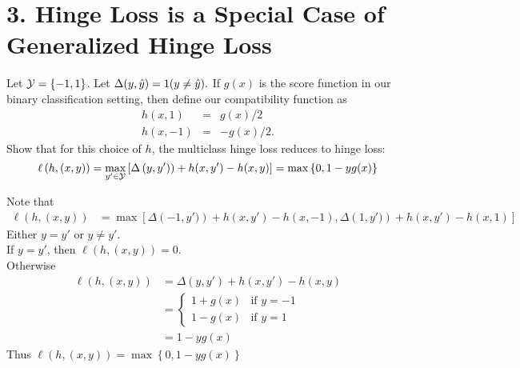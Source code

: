 \documentclass[12pt,letterpaper]{article}
\begin{document}
\section*{3. Hinge Loss is a Special Case of Generalized Hinge Loss}
\begin{problem}{3}
    Let $\mathcal{Y}=\left\{ -1,1\right\} $. Let $\Delta(y,\hat{y})=1(y\neq\hat{y}).$
    If $g(x)$ is the score function in our binary classification setting,
    then define our compatibility function as 
    \begin{eqnarray*}
    h(x,1) & = & g(x)/2\\
    h(x,-1) & = & -g(x)/2.
    \end{eqnarray*}
    Show that for this choice of $h$, the multiclass hinge loss reduces
    to hinge loss: 
    \[
    \ell\left(h,\left(x,y\right)\right)=\max_{y'\in\mathcal{Y}}\left[\Delta\left(y,y')\right)+h(x,y')-h(x,y)\right]=\max\left\{ 0,1-yg(x)\right\} 
    \]
\end{problem}
\begin{solution}{}
    Note that
    \begin{align*}
        \ell\left(h,\left(x,y\right)\right) &= \max\left[\Delta\left(-1,y')\right)+h(x,y')-h(x,-1), \Delta\left(1,y')\right)+h(x,y')-h(x,1)\right]
    \end{align*}
    Either $y=y'$ or $y\neq y'$.\\
    If $y=y'$, then $\ell(h,(x,y)) = 0$.\\
    Otherwise
    \begin{align*}
        \ell(h,(x,y)) &= \Delta(y,y') + h(x,y') - h(x,y)\\
        &= \left\{
            	\begin{array}{ll}
            		1 + g(x)  & \mbox{if } y = -1 \\
            		1 - g(x) & \mbox{if } y = 1
            	\end{array}
            \right.\\
        &= 1-yg(x)
    \end{align*}
    Thus $\ell\left(h,\left(x,y\right)\right) = \max\left\{ 0,1-yg(x)\right\}$
\end{solution}
\newpage
\end{document}
